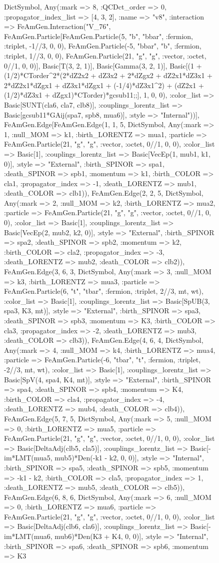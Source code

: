 \documentclass{revtex4}
\begin{document}
\begin{figure}[!htb]
\begin{center}
{Dict{Symbol, Any}(:mark => 8, :QCDct_order => 0, :propagator_index_list => [4, 3, 2], :name => "v8", :interaction => FeAmGen.Interaction("V_76", FeAmGen.Particle[FeAmGen.Particle(5, "b", "bbar", :fermion, :triplet, -1//3, 0, 0), FeAmGen.Particle(-5, "bbar", "b", :fermion, :triplet, 1//3, 0, 0), FeAmGen.Particle(21, "g", "g", :vector, :octet, 0//1, 0, 0)], Basic[T(3, 2, 1)], Basic[Gamma(3, 2, 1)], Basic[(1 + (1/2)*CTorder^2*(2*dZ2x2 + dZ3x2 + 2*dZgx2 + dZ2x1*dZ3x1 + 2*dZ2x1*dZgx1 + dZ3x1*dZgx1 + (-1/4)*dZ3x1^2) + (dZ2x1 + (1/2)*dZ3x1 + dZgx1)*CTorder)*gcsub11;;], 1, 0, 0), :color_list => Basic[SUNT(cla6, cla7, clb8)], :couplings_lorentz_list => Basic[gcsub11*GAij(spa7, spb8, mua6)], :style => "Internal"))], FeAmGen.Edge[FeAmGen.Edge(1, 1, 5, Dict{Symbol, Any}(:mark => 1, :null_MOM => k1, :birth_LORENTZ => mua1, :particle => FeAmGen.Particle(21, "g", "g", :vector, :octet, 0//1, 0, 0), :color_list => Basic[1], :couplings_lorentz_list => Basic[VecEp(1, mub1, k1, 0)], :style => "External", :birth_SPINOR => spa1, :death_SPINOR => spb1, :momentum => k1, :birth_COLOR => cla1, :propagator_index => -1, :death_LORENTZ => mub1, :death_COLOR => clb1)), FeAmGen.Edge(2, 2, 5, Dict{Symbol, Any}(:mark => 2, :null_MOM => k2, :birth_LORENTZ => mua2, :particle => FeAmGen.Particle(21, "g", "g", :vector, :octet, 0//1, 0, 0), :color_list => Basic[1], :couplings_lorentz_list => Basic[VecEp(2, mub2, k2, 0)], :style => "External", :birth_SPINOR => spa2, :death_SPINOR => spb2, :momentum => k2, :birth_COLOR => cla2, :propagator_index => -3, :death_LORENTZ => mub2, :death_COLOR => clb2)), FeAmGen.Edge(3, 6, 3, Dict{Symbol, Any}(:mark => 3, :null_MOM => k3, :birth_LORENTZ => mua3, :particle => FeAmGen.Particle(6, "t", "tbar", :fermion, :triplet, 2//3, mt, wt), :color_list => Basic[1], :couplings_lorentz_list => Basic[SpUB(3, spa3, K3, mt)], :style => "External", :birth_SPINOR => spa3, :death_SPINOR => spb3, :momentum => K3, :birth_COLOR => cla3, :propagator_index => -2, :death_LORENTZ => mub3, :death_COLOR => clb3)), FeAmGen.Edge(4, 6, 4, Dict{Symbol, Any}(:mark => 4, :null_MOM => k4, :birth_LORENTZ => mua4, :particle => FeAmGen.Particle(-6, "tbar", "t", :fermion, :triplet, -2//3, mt, wt), :color_list => Basic[1], :couplings_lorentz_list => Basic[SpV(4, spa4, K4, mt)], :style => "External", :birth_SPINOR => spa4, :death_SPINOR => spb4, :momentum => K4, :birth_COLOR => cla4, :propagator_index => -4, :death_LORENTZ => mub4, :death_COLOR => clb4)), FeAmGen.Edge(5, 7, 5, Dict{Symbol, Any}(:mark => 5, :null_MOM => 0, :birth_LORENTZ => mua5, :particle => FeAmGen.Particle(21, "g", "g", :vector, :octet, 0//1, 0, 0), :color_list => Basic[DeltaAdj(clb5, cla5)], :couplings_lorentz_list => Basic[-im*LMT(mua5, mub5)*Den(-k1 - k2, 0, 0)], :style => "Internal", :birth_SPINOR => spa5, :death_SPINOR => spb5, :momentum => -k1 - k2, :birth_COLOR => cla5, :propagator_index => 1, :death_LORENTZ => mub5, :death_COLOR => clb5)), FeAmGen.Edge(6, 8, 6, Dict{Symbol, Any}(:mark => 6, :null_MOM => 0, :birth_LORENTZ => mua6, :particle => FeAmGen.Particle(21, "g", "g", :vector, :octet, 0//1, 0, 0), :color_list => Basic[DeltaAdj(clb6, cla6)], :couplings_lorentz_list => Basic[-im*LMT(mua6, mub6)*Den(K3 + K4, 0, 0)], :style => "Internal", :birth_SPINOR => spa6, :death_SPINOR => spb6, :momentum => K3 }
\end{center}
\end{figure}
\end{document}
